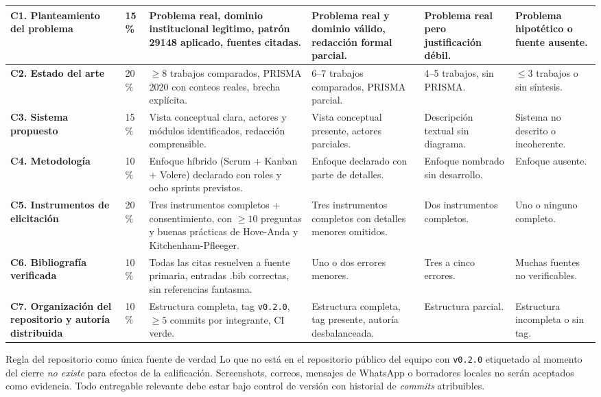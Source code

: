 \documentclass[11pt,a4paper]{article}
\begin{document}
\begin{longtable}{|L{4.3cm}|C{0.9cm}|L{3.3cm}|L{2.4cm}|L{2.4cm}|L{1.6cm}|}
\textbf{C1. Planteamiento del problema} & 15\,\% & Problema real, dominio institucional legitimo, patr\'on 29148 aplicado, fuentes citadas. & Problema real y dominio v\'alido, redacci\'on formal parcial. & Problema real pero justificaci\'on d\'ebil. & Problema hipot\'etico o fuente ausente.\\ \hline
{}
\textbf{C2. Estado del arte} & 20\,\% & $\geq 8$ trabajos comparados, PRISMA 2020 con conteos reales, brecha expl\'icita. & 6--7 trabajos comparados, PRISMA parcial. & 4--5 trabajos, sin PRISMA. & $\leq 3$ trabajos o sin s\'intesis.\\ \hline
\textbf{C3. Sistema propuesto} & 15\,\% & Vista conceptual clara, actores y m\'odulos identificados, redacci\'on comprensible. & Vista conceptual presente, actores parciales. & Descripci\'on textual sin diagrama. & Sistema no descrito o incoherente.\\ \hline
{}
\textbf{C4. Metodolog\'ia} & 10\,\% & Enfoque h\'ibrido (Scrum + Kanban + Volere) declarado con roles y ocho sprints previstos. & Enfoque declarado con parte de detalles. & Enfoque nombrado sin desarrollo. & Enfoque ausente.\\ \hline
\textbf{C5. Instrumentos de elicitaci\'on} & 20\,\% & Tres instrumentos completos + consentimiento, con $\geq 10$ preguntas y buenas pr\'acticas de Hove-Anda y Kitchenham-Pfleeger. & Tres instrumentos completos con detalles menores omitidos. & Dos instrumentos completos. & Uno o ninguno completo.\\ \hline
{}
\textbf{C6. Bibliograf\'ia verificada} & 10\,\% & Todas las citas resuelven a fuente primaria, entradas .bib correctas, sin referencias fantasma. & Uno o dos errores menores. & Tres a cinco errores. & Muchas fuentes no verificables.\\ \hline
\textbf{C7. Organizaci\'on del repositorio y autor\'ia distribuida} & 10\,\% & Estructura completa, tag \texttt{v0.2.0}, $\geq 5$ commits por integrante, CI verde. & Estructura completa, tag presente, autor\'ia desbalanceada. & Estructura parcial. & Estructura incompleta o sin tag.\\ \hline
\end{longtable}

\begin{cajacritica}{Regla del repositorio como \'unica fuente de verdad}
Lo que no est\'a en el repositorio p\'ublico del equipo con \texttt{v0.2.0} etiquetado al momento del cierre \emph{no existe} para efectos de la calificaci\'on. Screenshots, correos, mensajes de WhatsApp o borradores locales no ser\'an aceptados como evidencia. Todo entregable relevante debe estar bajo control de versi\'on con historial de \emph{commits} atribuibles.
\end{cajacritica}
\end{document}
